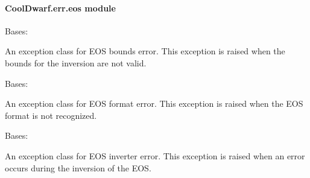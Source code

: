 \documentclass[letterpaper,10pt,english]{sphinxmanual}
\begin{document}
\paragraph{CoolDwarf.err.eos module}
\label{\detokenize{CoolDwarf.err:module-CoolDwarf.err.eos}}\label{\detokenize{CoolDwarf.err:cooldwarf-err-eos-module}}

\begin{fulllineitems}
\label{\detokenize{CoolDwarf.err:CoolDwarf.err.eos.EOSBoundsError}}
\pysigstartsignatures
{}
\pysigstopsignatures
\sphinxAtStartPar
Bases: 

\sphinxAtStartPar
An exception class for EOS bounds error. This exception is raised when the bounds for the inversion are not valid.

\end{fulllineitems}


\begin{fulllineitems}
\label{\detokenize{CoolDwarf.err:CoolDwarf.err.eos.EOSFormatError}}
\pysigstartsignatures
{}
\pysigstopsignatures
\sphinxAtStartPar
Bases: 

\sphinxAtStartPar
An exception class for EOS format error. This exception is raised when the EOS format is not recognized.

\end{fulllineitems}


\begin{fulllineitems}
\label{\detokenize{CoolDwarf.err:CoolDwarf.err.eos.EOSInverterError}}
\pysigstartsignatures
{}
\pysigstopsignatures
\sphinxAtStartPar
Bases: 

\sphinxAtStartPar
An exception class for EOS inverter error. This exception is raised when an error occurs during the inversion of the EOS.

\end{fulllineitems}
\end{document}
